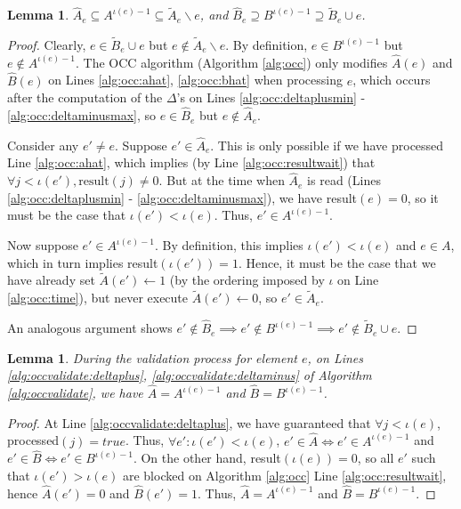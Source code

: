 \documentclass{article} %
\newtheorem{lem}[thm]{Lemma}
\begin{document}
\begin{lem} $\hat{A}_e \subseteq A^{\iota(e)-1} \subseteq \tilde{A}_e \backslash e$, and $\hat{B}_e \supseteq B^{\iota(e)-1} \supseteq \tilde{B}_e \cup e$.
\end{lem}
\begin{proof}
Clearly, $e \in \tilde{B}_e\cup e$ but $e\not\in \tilde{A}_e\backslash e$.
By definition, $e \in B^{\iota(e)-1}$ but $e\not\in A^{\iota(e)-1}$.
The OCC algorithm (Algorithm \ref{alg:occ}) only modifies $\hat{A}(e)$ and $\hat{B}(e)$ on Lines \ref{alg:occ:ahat}, \ref{alg:occ:bhat} when processing $e$, which occurs after the computation of the $\Delta$'s on Lines \ref{alg:occ:deltaplusmin} - \ref{alg:occ:deltaminusmax}, so $e \in \hat{B}_e$ but $e\not\in \hat{A}_e$.

Consider any $e'\neq e$.
Suppose $e' \in \hat{A}_e$.
This is only possible if we have processed Line \ref{alg:occ:ahat}, which implies (by Line \ref{alg:occ:resultwait}) that $\forall j < \iota(e'), \text{result}(j) \neq 0$.
But at the time when $\hat{A}_e$ is read (Lines \ref{alg:occ:deltaplusmin} - \ref{alg:occ:deltaminusmax}), we have result$(e)=0$, so it must be the case that $\iota(e') < \iota(e)$.
Thus, $e' \in A^{\iota(e)-1}$.

Now suppose $e' \in A^{\iota(e)-1}$.
By definition, this implies $\iota(e') < \iota(e)$ and $e \in A$, which in turn implies result$(\iota(e'))=1$.
Hence, it must be the case that we have already set $\tilde{A}(e') \leftarrow 1$ (by the ordering imposed by $\iota$ on Line \ref{alg:occ:time}), but never execute $\tilde{A}(e') \leftarrow 0$, so $e' \in \tilde{A}_e$.

An analogous argument shows $e' \not\in \hat{B}_e \implies e' \not\in B^{\iota(e)-1} \implies e' \not\in\tilde{B}_e \cup e$.
\end{proof}

\begin{lem}
During the validation process for element $e$, on Lines \ref{alg:occvalidate:deltaplus}, \ref{alg:occvalidate:deltaminus} of Algorithm \ref{alg:occvalidate}, we have $\hat{A} = A^{\iota(e)-1}$ and $\hat{B} = B^{\iota(e)-1}$.
\end{lem}
\begin{proof}
At Line \ref{alg:occvalidate:deltaplus}, we have guaranteed that $\forall j < \iota(e)$, processed$(j) = true$.
Thus, $\forall e': \iota(e') < \iota(e)$, $e' \in \hat{A} \iff e' \in A^{\iota(e)-1}$ and $e' \in \hat{B} \iff e' \in B^{\iota(e)-1}$.
On the other hand, result$(\iota(e)) = 0$, so all $e'$ such that $\iota(e') > \iota(e)$ are blocked on Algorithm \ref{alg:occ} Line \ref{alg:occ:resultwait}, hence $\hat{A}(e') = 0$ and $\hat{B}(e') = 1$.
Thus, $\hat{A} = A^{\iota(e)-1}$ and $\hat{B} = B^{\iota(e)-1}$.
\end{proof}
\end{document}
